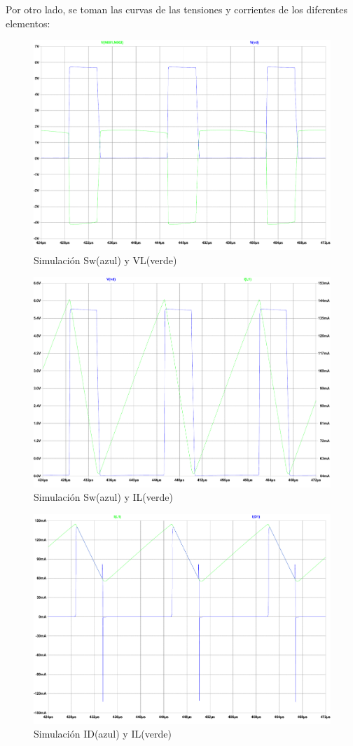 \documentclass[e4_tp1_main.tex]{subfiles}
\begin{document}
Por otro lado, se toman las curvas de las tensiones y corrientes de los diferentes elementos:

\begin{figure}[H]
\centering
\includegraphics[width=0.8\linewidth]{Imagenes/Punto3/Sw-VL.pdf}
\caption{Simulación Sw(azul) y VL(verde)}
\end{figure}

\begin{figure}[H]
\centering
\includegraphics[width=0.8\linewidth]{Imagenes/Punto3/Sw-IL.pdf}
\caption{Simulación Sw(azul) y IL(verde)}
\end{figure}

\begin{figure}[H]
\centering
\includegraphics[width=0.8\linewidth]{Imagenes/Punto3/ID-IL.pdf}
\caption{Simulación ID(azul) y IL(verde)}
\end{figure}
\end{document}
